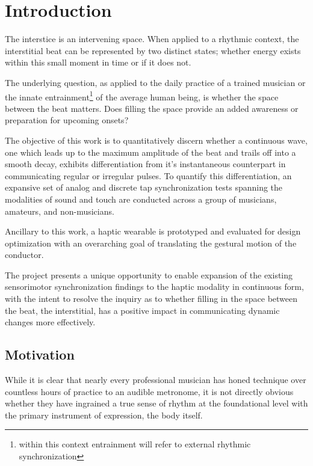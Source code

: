 
\chapter{Introduction} \label{secIntro}
The interstice is an intervening space. When applied to a rhythmic context, the interstitial beat can be represented by two distinct states; whether energy exists within this small moment in time or if it does not. 

The underlying question, as applied to the daily practice of a trained musician or the innate entrainment\footnote{within this context entrainment will refer to external rhythmic synchronization} of the average human being, is whether the space between the beat matters. Does filling the space provide an added awareness or preparation for upcoming onsets?

The objective of this work is to quantitatively discern whether a continuous wave, one which leads up to the maximum amplitude of the beat and trails off into a smooth decay, exhibits differentiation from it's instantaneous counterpart in communicating regular or irregular pulses. To quantify this differentiation, an expansive set of analog and discrete tap synchronization tests spanning the modalities of sound and touch are conducted across a group of musicians, amateurs, and non-musicians.

Ancillary to this work, a haptic wearable is prototyped and evaluated for design optimization with an overarching goal of translating the gestural motion of the conductor.

The project presents a unique opportunity to enable expansion of the existing sensorimotor synchronization findings to the haptic modality in continuous form, with the intent to resolve the inquiry as to whether filling in the space between the beat, the interstitial, has a positive impact in communicating dynamic changes more effectively.

\section{Motivation}
While it is clear that nearly every professional musician has honed technique over countless hours of practice to an audible metronome, it is not directly obvious whether they have ingrained a true sense of rhythm at the foundational level with the primary instrument of expression, the body itself.

